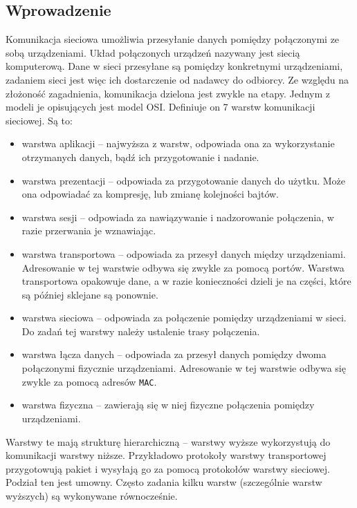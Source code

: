 \documentclass[a4paper, 11pt, twoside, openright]{article}
\begin{document}
	\subsection{Wprowadzenie}

	\indent\par
	Komunikacja sieciowa umożliwia przesyłanie danych pomiędzy połączonymi ze sobą urządzeniami. Układ połączonych urządzeń nazywany jest siecią komputerową.
	Dane w sieci przesyłane są pomiędzy konkretnymi urządzeniami, zadaniem sieci jest więc ich dostarczenie od nadawcy do odbiorcy.
	Ze względu na złożoność zagadnienia, komunikacja dzielona jest zwykle na etapy.
	Jednym z modeli je opisujących jest model OSI. Definiuje on 7 warstw komunikacji sieciowej. Są to:
	\begin{itemize}
		\item warstwa aplikacji -- najwyższa z warstw, odpowiada ona za wykorzystanie otrzymanych danych, bądź ich przygotowanie i nadanie.
		\item warstwa prezentacji -- odpowiada za przygotowanie danych do użytku. Może ona odpowiadać za kompresję, lub zmianę kolejności bajtów.
		\item warstwa sesji -- odpowiada za nawiązywanie i nadzorowanie połączenia, w razie przerwania je wznawiając.
		\item warstwa transportowa -- odpowiada za przesył danych między urządzeniami. Adresowanie w tej warstwie odbywa się zwykle za pomocą portów. Warstwa
			transportowa opakowuje dane, a w razie konieczności dzieli je na części, które są później sklejane są ponownie.
		\item warstwa sieciowa -- odpowiada za połączenie pomiędzy urządzeniami w sieci. Do zadań tej warstwy należy ustalenie trasy połączenia.
		\item warstwa łącza danych -- odpowiada za przesył danych pomiędzy dwoma połączonymi fizycznie urządzeniami. Adresowanie w tej warstwie odbywa się
			zwykle za pomocą adresów \texttt{MAC}.
		\item warstwa fizyczna -- zawierają się w niej fizyczne połączenia pomiędzy urządzeniami.
	\end{itemize}

	Warstwy te mają strukturę hierarchiczną -- warstwy wyższe wykorzystują do komunikacji warstwy niższe. Przykładowo protokoły warstwy transportowej przygotowują
	pakiet i wysyłają go za pomocą protokołów warstwy sieciowej. Podział ten jest umowny. Często zadania kilku warstw (szczególnie warstw wyższych) są wykonywane
	równocześnie.
\end{document}
